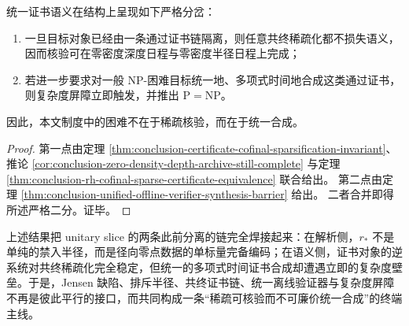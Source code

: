 \begin{corollary}\label{cor:conclusion-certificate-verification-synthesis-bifurcation}
统一证书语义在结构上呈现如下严格分岔：
\begin{enumerate}
  \item 一旦目标对象已经由一条通过证书链隔离，则任意共终稀疏化都不损失语义，因而核验可在零密度深度日程与零密度半径日程上完成；
  \item 若进一步要求对一般 NP-困难目标统一地、多项式时间地合成这类通过证书，则复杂度屏障立即触发，并推出 \(\mathrm{P}=\mathrm{NP}\)。
\end{enumerate}
因此，本文制度中的困难不在于稀疏核验，而在于统一合成。
\end{corollary}

\begin{proof}
第一点由定理 \ref{thm:conclusion-certificate-cofinal-sparsification-invariant}、推论 \ref{cor:conclusion-zero-density-depth-archive-still-complete} 与定理 \ref{thm:conclusion-rh-cofinal-sparse-certificate-equivalence} 联合给出。
第二点由定理 \ref{thm:conclusion-unified-offline-verifier-synthesis-barrier} 给出。
二者合并即得所述严格二分。证毕。
\end{proof}

\noindent
上述结果把 unitary slice 的两条此前分离的链完全焊接起来：在解析侧，\(r_\ast\) 不是单纯的禁入半径，而是径向零点数据的单标量完备编码；在语义侧，证书对象的逆系统对共终稀疏化完全稳定，但统一的多项式时间证书合成却遭遇立即的复杂度壁垒。于是，Jensen 缺陷、排斥半径、共终证书链、统一离线验证器与复杂度屏障不再是彼此平行的接口，而共同构成一条“稀疏可核验而不可廉价统一合成”的终端主线。

\endinput
